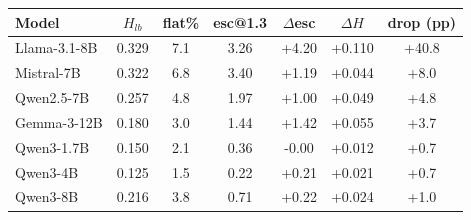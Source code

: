 \begin{tabular}{lcccccc}
\toprule
Model & $H_{lb}$ & flat\% & esc@1.3 & $\Delta$esc & $\Delta H$ & drop (pp) \\
\midrule
Llama-3.1-8B & 0.329 & 7.1 & 3.26 & +4.20 & +0.110 & +40.8 \\
Mistral-7B & 0.322 & 6.8 & 3.40 & +1.19 & +0.044 & +8.0 \\
Qwen2.5-7B & 0.257 & 4.8 & 1.97 & +1.00 & +0.049 & +4.8 \\
Gemma-3-12B & 0.180 & 3.0 & 1.44 & +1.42 & +0.055 & +3.7 \\
Qwen3-1.7B & 0.150 & 2.1 & 0.36 & -0.00 & +0.012 & +0.7 \\
Qwen3-4B & 0.125 & 1.5 & 0.22 & +0.21 & +0.021 & +0.7 \\
Qwen3-8B & 0.216 & 3.8 & 0.71 & +0.22 & +0.024 & +1.0 \\
\bottomrule
\end{tabular}
